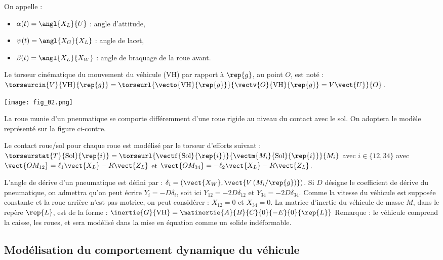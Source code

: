 On appelle :
\begin{itemize}
\item $\alpha(t)=\angl{X_L}{U}$ : angle d’attitude,
\item $\psi(t)=\angl{X_G}{X_L}$ : angle de lacet,
\item $\beta(t)=\angl{X_L}{X_W}$ : angle de braquage de la roue avant.
\end{itemize}
Le torseur cinématique du mouvement du véhicule (VH) par rapport à $\rep{g}$, au
point $O$, est noté :
$\torseurcin{V}{\text{VH}}{\rep{g}}=\torseurl{\vecto{\text{VH}}{\rep{g}}}{\vectv{O}{\text{VH}}{\rep{g}}=V\vect{U}}{O}$.


\begin{marginfigure}
\texttt{[image: fig\_02.png]}
\end{marginfigure}
La roue munie d’un pneumatique se comporte différemment d’une roue rigide au niveau du contact avec le sol.
On adoptera le modèle représenté sur la figure ci-contre.

Le contact roue/sol pour chaque roue est modélisé par le torseur d’efforts
suivant :
$\torseurstat{T}{\text{Sol}}{\rep{i}}=\torseurl{\vectf{\text{Sol}}{\rep{i}} }{\vectm{M_i}{\text{Sol}}{\rep{i}}}{M_i} $ avec  $i\in\{12,34\}$ avec $\vect{OM_{12}}=\ell_1\vect{X_L}-R\vect{Z_L}$ et $\vect{OM_{34}}=-\ell_2\vect{X_L}-R\vect{Z_L}$.


L’angle de dérive d’un pneumatique est défini par : $\delta_i=\left(\vect{X_W},\vect{V\left(M_i / \rep{g} \right)}\right)$. Si
$D$ désigne le coefficient de dérive du pneumatique, on admettra qu’on peut écrire $Y_i = - D\delta_i$, soit ici $Y_{12}=-2D\delta_{12}$ et $Y_{34}=-2D\delta_{34}$.
Comme la vitesse du véhicule est supposée constante et la roue arrière n’est pas motrice, on peut considérer : $X_{12}=0$ et $X_{34}=0$.
La matrice d’inertie du véhicule de masse $M$, dans le repère $\rep{L}$, est de la
forme : $\inertie{G}{\text{VH}}=\matinertie{A}{B}{C}{0}{-E}{0}{\rep{L}}$
Remarque : le véhicule comprend la caisse, les roues, et sera modélisé
dans la mise en équation comme un solide indéformable.
\fi

\subsection*{Modélisation du comportement dynamique du véhicule}

